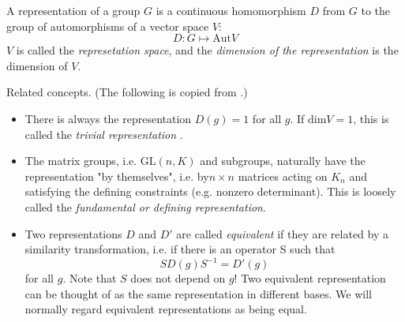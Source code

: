 \begin{defi}[Representation]
    A representation of a group $G$ is a continuous homomorphism $D$
    from $G$ to the group of automorphisms of a vector space $V$:
    \begin{equation}
        D: G\mapsto \mathrm{Aut}V
    \end{equation}
    $V$ is called the \textit{represetation space}, and the
    \textit{dimension of the representation} is the dimension of $V$.
\end{defi}

Related concepts. (The following is copied from \cite{Ludeling}.)

\begin{itemize}
    \item There is always the representation $D(g) = 1$ for all $g$.
        If $\mathrm{dim} V = 1$, this is called the \textit{trivial
        representation} .
    \item The matrix groups, i.e. $\mathrm{GL}(n, K)$ and subgroups,
        naturally have the representation "by themselves", i.e.
        by$n\times n$ matrices acting on $K_n$ and satisfying the
        defining constraints (e.g. nonzero determinant). This is
        loosely called the \textit{fundamental or defining
        representation}.
    \item Two representations $D$ and $D'$ are called
        \textit{equivalent} if they are related by a
        similarity transformation, i.e. if there is an operator S such
        that
        \begin{equation}
            SD(g)S^{-1} = D'(g)
        \end{equation}
        for all $g$. Note that $S$ does not depend on $g$! Two equivalent
        representation can be thought of as the same representation in
        different bases. We will normally regard equivalent
        representations as being equal.


\end{itemize}
